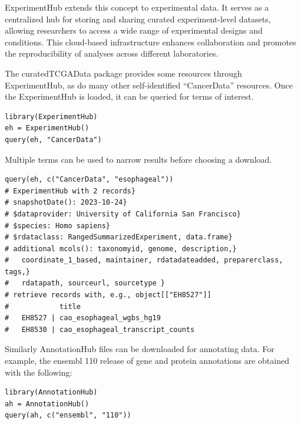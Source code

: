 \documentclass[graybox]{svmult}
\begin{document}
ExperimentHub extends this concept to experimental data. It serves as a
centralized hub for storing and sharing curated experiment-level datasets,
allowing researchers to access a wide range of experimental designs and
conditions. This cloud-based infrastructure enhances collaboration and promotes
the reproducibility of analyses across different laboratories.

The curatedTCGAData package provides some resources through
ExperimentHub, as do many other self-identified ``CancerData'' resources. Once the
ExperimentHub is loaded, it can be queried for terms of interest.

\begin{shaded}
\begin{verbatim}
library(ExperimentHub)
eh = ExperimentHub()
query(eh, "CancerData")
\end{verbatim}
\end{shaded}


Multiple terms can be used to narrow results before choosing a download.

\begin{shaded}
\begin{verbatim}
query(eh, c("CancerData", "esophageal"))
# ExperimentHub with 2 records}
# snapshotDate(): 2023-10-24}
# $dataprovider: University of California San Francisco}
# $species: Homo sapiens}
# $rdataclass: RangedSummarizedExperiment, data.frame}
# additional mcols(): taxonomyid, genome, description,}
#   coordinate_1_based, maintainer, rdatadateadded, preparerclass, tags,}
#   rdatapath, sourceurl, sourcetype }
# retrieve records with, e.g., object[["EH8527"]]
#            title                           
#   EH8527 | cao_esophageal_wgbs_hg19        
#   EH8530 | cao_esophageal_transcript_counts
\end{verbatim}
\end{shaded}

Similarly AnnotationHub files can be downloaded for annotating data. For example,
the ensembl 110 release of gene and protein annotations are obtained with the
following:

\begin{shaded}
\begin{verbatim}
library(AnnotationHub)
ah = AnnotationHub()
query(ah, c("ensembl", "110"))
\end{verbatim}
\end{shaded}









%


\end{document}
